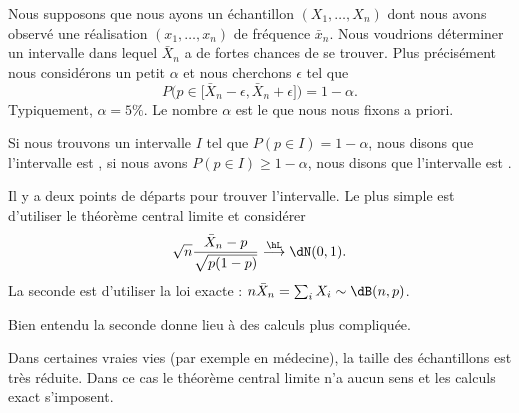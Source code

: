 Nous supposons que nous ayons un échantillon \( (X_1,\ldots,X_n)\) dont nous avons observé une réalisation \( (x_1,\ldots,x_n)\) de fréquence \( \bar x_n\). Nous voudrions déterminer un intervalle dans lequel \( \bar X_n\) a de fortes chances de se trouver. Plus précisément nous considérons un petit \( \alpha\) et nous cherchons \( \epsilon\) tel que
\begin{equation}
    P\big( p\in\mathopen[ \bar X_n-\epsilon , \bar X_n+\epsilon \mathclose] \big)=1-\alpha.
\end{equation}
Typiquement, \( \alpha=5\%\). Le nombre \( \alpha\) est le  que nous nous fixons a priori.

Si nous trouvons un intervalle \( I\) tel que \( P(p\in I)=1-\alpha\), nous disons que l'intervalle est , si nous avons \( P(p\in I)\geq 1-\alpha\), nous disons que l'intervalle est .

Il y a deux points de départs pour trouver l'intervalle. Le plus simple est d'utiliser le théorème central limite et considérer
\begin{equation}
    \sqrt{n}\frac{ \bar X_n-p }{ \sqrt{p(1-p)} }\stackrel{\hL}{\longrightarrow}\dN(0,1).
\end{equation}
La seconde est d'utiliser la loi exacte : \( n\bar X_n=\sum_i X_i\sim \dB(n,p)\).

Bien entendu la seconde donne lieu à des calculs plus compliquée.

\begin{remark}
    Dans certaines vraies vies (par exemple en médecine), la taille des échantillons est très réduite. Dans ce cas le théorème central limite n'a aucun sens et les calculs exact s'imposent.
\end{remark}

